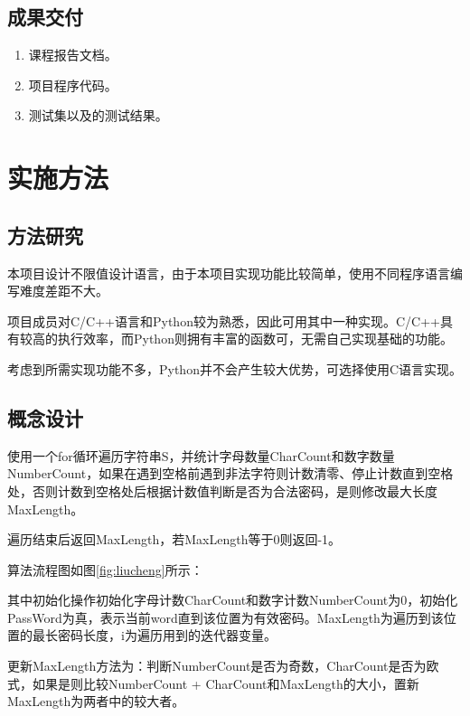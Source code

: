 \begin{spacing}{1.5}
    \subsection{成果交付}
    \begin{enumerate} [\indent 1、]
        \item 课程报告文档。
        \item 项目程序代码。
        \item 测试集以及的测试结果。
    \end{enumerate}
    \section{实施方法}
    \subsection{方法研究}
    本项目设计不限值设计语言，由于本项目实现功能比较简单，使用不同程序语言编写难度差距不大。

    项目成员对C/C++语言和Python较为熟悉，因此可用其中一种实现。C/C++具有较高的执行效率，而Python则拥有丰富的函数可，无需自己实现基础的功能。

    考虑到所需实现功能不多，Python并不会产生较大优势，可选择使用C语言实现。

    \subsection{概念设计}
    使用一个for循环遍历字符串S，并统计字母数量CharCount和数字数量NumberCount，如果在遇到空格前遇到非法字符则计数清零、停止计数直到空格处，否则计数到空格处后根据计数值判断是否为合法密码，是则修改最大长度MaxLength。

    遍历结束后返回MaxLength，若MaxLength等于0则返回-1。

    算法流程图如图\ref{fig:liucheng}所示：

    

   其中初始化操作初始化字母计数CharCount和数字计数NumberCount为0，初始化PassWord为真，表示当前word直到该位置为有效密码。MaxLength为遍历到该位置的最长密码长度，i为遍历用到的迭代器变量。
   
   更新MaxLength方法为：判断NumberCount是否为奇数，CharCount是否为欧式，如果是则比较NumberCount + CharCount和MaxLength的大小，置新MaxLength为两者中的较大者。


\end{spacing}
